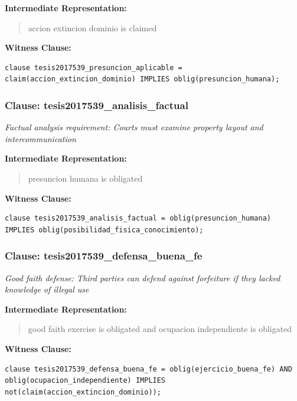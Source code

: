 \documentclass[11pt,a4paper]{article}
\begin{document}
\textbf{Intermediate Representation:}

\begin{quote}
accion extincion dominio is claimed
\end{quote}

\textbf{Witness Clause:}

\begin{lstlisting}[style=witnessstyle, language=Witness]
clause tesis2017539_presuncion_aplicable = claim(accion_extincion_dominio) IMPLIES oblig(presuncion_humana);
\end{lstlisting}

\subsubsection{Clause: tesis2017539\_analisis\_factual}

\textit{Factual analysis requirement: Courts must examine property layout and intercommunication}

\textbf{Intermediate Representation:}

\begin{quote}
presuncion humana is obligated
\end{quote}

\textbf{Witness Clause:}

\begin{lstlisting}[style=witnessstyle, language=Witness]
clause tesis2017539_analisis_factual = oblig(presuncion_humana) IMPLIES oblig(posibilidad_fisica_conocimiento);
\end{lstlisting}

\subsubsection{Clause: tesis2017539\_defensa\_buena\_fe}

\textit{Good faith defense: Third parties can defend against forfeiture if they lacked knowledge of illegal use}

\textbf{Intermediate Representation:}

\begin{quote}
good faith exercise is obligated and ocupacion independiente is obligated
\end{quote}

\textbf{Witness Clause:}

\begin{lstlisting}[style=witnessstyle, language=Witness]
clause tesis2017539_defensa_buena_fe = oblig(ejercicio_buena_fe) AND oblig(ocupacion_independiente) IMPLIES not(claim(accion_extincion_dominio));
\end{lstlisting}
\end{document}
